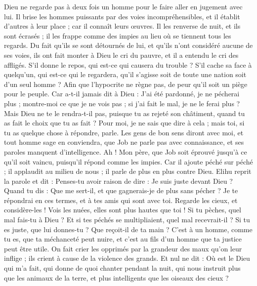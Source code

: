 \begin{multicols}{2}
Dieu ne regarde pas à deux fois un homme pour le faire aller en jugement avec lui.
Il brise les hommes puissants par des voies incompréhensibles, et il établit d'autres à leur place ;
car il connaît leurs œuvres. Il les renverse de nuit, et ils sont écrasés ;
il les frappe comme des impies au lieu où se tiennent tous les regards.
Du fait qu'ils se sont détournés de lui, et qu'ils n'ont considéré aucune de ses voies,
ils ont fait monter à Dieu le cri du pauvre, et il a entendu le cri des affligés.
S'il donne le repos, qui est-ce qui causera du trouble ? S'il cache sa face à quelqu'un, qui est-ce qui le regardera, qu'il s'agisse soit de toute une nation soit d'un seul homme ?
Afin que l'hypocrite ne règne pas, de peur qu'il soit un piège pour le peuple.
Car a-t-il jamais dit à Dieu : J'ai été pardonné, je ne pécherai plus ;
montre-moi ce que je ne vois pas ; si j'ai fait le mal, je ne le ferai plus ?
Mais Dieu ne te le rendra-t-il pas, puisque tu as rejeté son châtiment, quand tu as fait le choix que tu as fait ? Pour moi, je ne sais que dire à cela ; mais toi, si tu as quelque chose à répondre, parle.
Les gens de bon sens diront avec moi, et tout homme sage en conviendra,
que Job ne parle pas avec connaissance, et ses paroles manquent d'intelligence.
Ah ! Mon père, que Job soit éprouvé jusqu'à ce qu'il soit vaincu, puisqu'il répond comme les impies.
Car il ajoute péché sur péché ; il applaudit au milieu de nous ; il parle de plus en plus contre Dieu.
\VerseOne{}Elihu reprit la parole et dit :
Penses-tu avoir raison de dire : Je suis juste devant Dieu ?
Quand tu dis : Que me sert-il, et que gagnerais-je de plus sans pécher ?
Je te répondrai en ces termes, et à tes amis qui sont avec toi.
Regarde les cieux, et considère-les ! Vois les nuées, elles sont plus hautes que toi !
Si tu pèches, quel mal fais-tu à Dieu ? Et si tes péchés se multipliaient, quel mal recevrait-il ?
Si tu es juste, que lui donnes-tu ? Que reçoit-il de ta main ?
C'est à un homme, comme tu es, que ta méchanceté peut nuire, et c'est au fils d'un homme que ta justice peut être utile.
On fait crier les opprimés par la grandeur des maux qu'on leur inflige ; ils crient à cause de la violence des grands.
Et nul ne dit : Où est le Dieu qui m'a fait, qui donne de quoi chanter pendant la nuit,
qui nous instruit plus que les animaux de la terre, et plus intelligents que les oiseaux des cieux ?

\end{multicols}
